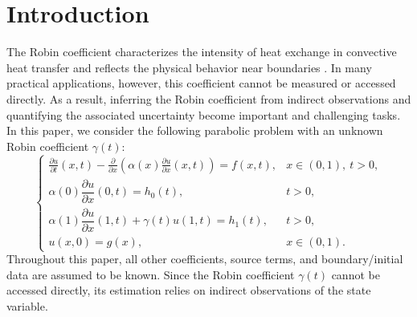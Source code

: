 \documentclass{ws-mplb}
\begin{document}
\section{Introduction}\label{s:1}

The Robin coefficient characterizes the intensity of heat exchange in convective heat transfer and reflects the physical behavior near boundaries \cite{Alessandrini2003, Arthern2010, Inglese1997, Jin2009}.
In many practical applications, however, this coefficient cannot be measured or accessed directly.
As a result, inferring the Robin coefficient from indirect observations and quantifying the associated uncertainty become important and challenging tasks.
In this paper, we consider the following parabolic problem with an unknown Robin coefficient $\gamma(t)$: 
\begin{equation}\label{eqn1}
\begin{cases}
\frac{\partial u}{\partial t}(x, t)
- \frac{\partial}{\partial x}\!\left(\alpha(x)\frac{\partial u}{\partial x}(x, t)\right)
= f(x, t),
& x \in (0, 1), \ t>0, \\[1ex]
\alpha(0) \dfrac{\partial u}{\partial x}(0, t) = h_0(t),
& t>0, \\[2ex]
\alpha(1) \dfrac{\partial u}{\partial x}(1, t) + \gamma(t) u(1, t) = h_1(t),
&  t>0, \\[1ex]
u(x, 0) = g(x),
& x \in (0, 1).
\end{cases}
\end{equation}
Throughout this paper, all other coefficients, source terms, and boundary/initial data are assumed to be known.
Since the Robin coefficient $\gamma(t)$ cannot be accessed directly, its estimation relies on indirect observations of the state variable.
\end{document}
